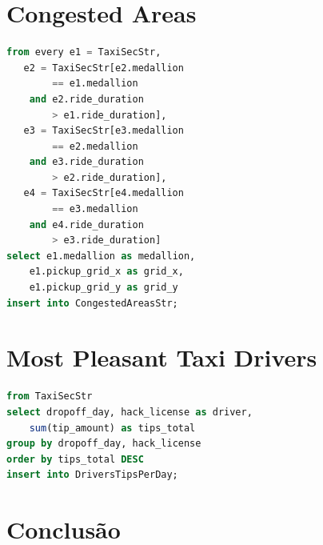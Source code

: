 \documentclass[article]{IEEEtran}
\begin{document}
\section{Congested Areas}
\begin{lstlisting}[language=SQL]
from every e1 = TaxiSecStr,
   e2 = TaxiSecStr[e2.medallion 
   		== e1.medallion 
	and e2.ride_duration 
		> e1.ride_duration],
   e3 = TaxiSecStr[e3.medallion 
   		== e2.medallion 
	and e3.ride_duration 
		> e2.ride_duration],
   e4 = TaxiSecStr[e4.medallion 
   		== e3.medallion
    and e4.ride_duration 
    	> e3.ride_duration]
select e1.medallion as medallion,
 	e1.pickup_grid_x as grid_x, 
 	e1.pickup_grid_y as grid_y
insert into CongestedAreasStr;
\end{lstlisting}

\section{Most Pleasant Taxi Drivers}

\begin{lstlisting}[language=SQL]
from TaxiSecStr
select dropoff_day, hack_license as driver,
	sum(tip_amount) as tips_total
group by dropoff_day, hack_license
order by tips_total DESC
insert into DriversTipsPerDay;
\end{lstlisting}

\section{Conclusão} 





\end{document}
